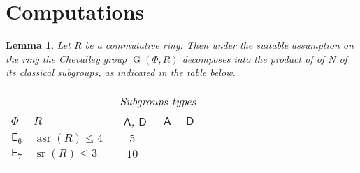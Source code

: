 \documentclass[oneside, 12pt]{amsart}
\theoremstyle{plain}
\numberwithin{equation}{section}
\newtheorem{lemma}{Lemma}
\numberwithin{lemma}{section}
\theoremstyle{definition}
\theoremstyle{remark}
\DeclareMathOperator{\G}{G}
\DeclareMathOperator{\sr}{sr}
\DeclareMathOperator{\asr}{asr}
\newcommand{\rA}{\mathsf{A}}
\newcommand{\rD}{\mathsf{D}}
\newcommand{\rE}{\mathsf{E}}
\begin{document}
\section{Computations}
\begin{lemma}
Let $R$ be a commutative ring. Then under the suitable assumption on the ring the Chevalley group $\G(\Phi, R)$ decomposes into the product of of $N$ of its classical subgroups, as indicated in the table below.
\begin{center}
\begin{tabular}{l@{\qquad}l@{\qquad}c@{\qquad}c@{\qquad}c}
\firsthline
& & \multicolumn{3}{l}{\ Subgroups types} \\ \cline{3-5}
$\Phi$ & $R$ & \ $\rA$, $\rD$ & $\rA$ & $\rD$ \\ \hline
$\rE_6$ & $\asr(R)\leqslant4$ & $5$ & & \\
$\rE_7$ & $\sr(R)\leqslant3$ & $10$ & & \\
\lasthline
\end{tabular}
\end{center}
\end{lemma}
\end{document}
